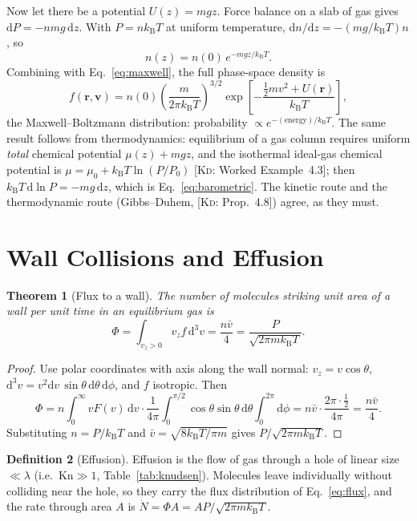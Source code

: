 \documentclass[11pt,a4paper]{report}
\theoremstyle{definition}
\newtheorem{definition}{Definition}[chapter]
\theoremstyle{plain}
\newtheorem{theorem}[definition]{Theorem}
\newcommand{\KD}[1]{[\textsc{Kd}: #1]}   %
\newcommand{\kB}{k_{\mathrm{B}}}
\newcommand{\dd}{\mathrm{d}}
\newcommand{\vv}{\mathbf{v}}
\newcommand{\rr}{\mathbf{r}}
\newcommand{\vbar}{\bar{v}}
\begin{document}
Now let there be a potential $U(z)=mgz$. Force balance on a slab of gas gives $\dd P=-nmg\,\dd z$. With $P=n\kB T$ at uniform temperature, $\dd n/\dd z=-(mg/\kB T)n$, so
\begin{equation}
n(z)=n(0)\,e^{-mgz/\kB T}.
\label{eq:barometric}
\end{equation}
Combining with Eq.~\eqref{eq:maxwell}, the full phase-space density is
\begin{equation}
f(\rr,\vv)=n(0)\left(\frac{m}{2\pi\kB T}\right)^{3/2}\exp\!\left[-\frac{\tfrac12mv^2+U(\rr)}{\kB T}\right],
\end{equation}
the Maxwell--Boltzmann distribution: probability $\propto e^{-(\text{energy})/\kB T}$. The same result follows from thermodynamics: equilibrium of a gas column requires uniform \emph{total} chemical potential $\mu(z)+mgz$, and the isothermal ideal-gas chemical potential is $\mu=\mu_0+\kB T\ln(P/P_0)$ \KD{Worked Example~4.3}; then $\kB T\,\dd\ln P=-mg\,\dd z$, which is Eq.~\eqref{eq:barometric}. The kinetic route and the thermodynamic route (Gibbs--Duhem, \KD{Prop.~4.8}) agree, as they must.

\section{Wall Collisions and Effusion}
\label{sec:effusion}

\begin{theorem}[Flux to a wall]\label{thm:flux}
The number of molecules striking unit area of a wall per unit time in an equilibrium gas is
\begin{equation}
\Phi=\int_{v_z>0}v_zf\,\dd^3v=\frac{n\vbar}{4}=\frac{P}{\sqrt{2\pi m\kB T}}.
\label{eq:flux}
\end{equation}
\end{theorem}
\begin{proof}
Use polar coordinates with axis along the wall normal: $v_z=v\cos\theta$, $\dd^3v=v^2\dd v\,\sin\theta\,\dd\theta\,\dd\phi$, and $f$ isotropic. Then
\[
\Phi=n\int_0^\infty vF(v)\,\dd v\cdot\frac{1}{4\pi}\int_0^{\pi/2}\!\!\cos\theta\sin\theta\,\dd\theta\int_0^{2\pi}\!\!\dd\phi
=n\vbar\cdot\frac{2\pi\cdot\frac12}{4\pi}=\frac{n\vbar}{4}.
\]
Substituting $n=P/\kB T$ and $\vbar=\sqrt{8\kB T/\pi m}$ gives $P/\sqrt{2\pi m\kB T}$.
\end{proof}

\begin{definition}[Effusion]
Effusion is the flow of gas through a hole of linear size $\ll\lambda$ (i.e.\ $\mathrm{Kn}\gg1$, Table~\ref{tab:knudsen}). Molecules leave individually without colliding near the hole, so they carry the flux distribution of Eq.~\eqref{eq:flux}, and the rate through area $A$ is $\dot N=\Phi A=AP/\sqrt{2\pi m\kB T}$.
\end{definition}
\end{document}
